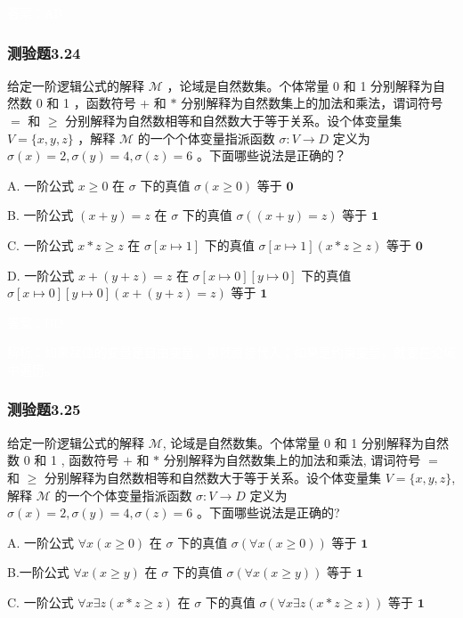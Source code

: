 \documentclass[UTF8, heading=true]{ctexart}
\begin{document}
\textcolor{white}{答案：AB}

\subsubsection{测验题3.24}

给定一阶逻辑公式的解释 $\mathcal{M}$ ，论域是自然数集。个体常量 0 和 1 分别解释为自然数 0 和 1 ，函数符号 + 和 $*$ 分别解释为自然数集上的加法和乘法，谓词符号 $=$ 和 $\geq$ 分别解释为自然数相等和自然数大于等于关系。设个体变量集 $V=\{x, y, z\}$ ，解释 $\mathcal{M}$ 的一个个体变量指派函数 $\sigma: V \rightarrow D$ 定义为 $\sigma(x)=2, \sigma(y)=4, \sigma(z)=6$ 。下面哪些说法是正确的？

A. 一阶公式 $x \geq 0$ 在 $\sigma$ 下的真值 $\sigma(x \geq 0)$ 等于 $\mathbf{0}$

B. 一阶公式 $(x+y)=z$ 在 $\sigma$ 下的真值 $\sigma((x+y)=z)$ 等于 $\mathbf{1}$

C. 一阶公式 $x * z \geq z$ 在 $\sigma[x \mapsto 1]$ 下的真值 $\sigma[x \mapsto 1](x * z \geq z)$ 等于 $\mathbf{0}$

D.  一阶公式 $x+(y+z)=z$ 在 $\sigma[x \mapsto 0][y \mapsto 0]$ 下的真值 $\sigma[x \mapsto 0][y \mapsto 0](x+(y+z)=z)$ 等于 $\mathbf{1}$

\textcolor{white}{答案：BD}

\textcolor{white}{解析：如果赋值的变量是自由变量，那就直接代入；如果是约束变量，就要在论域中遍历。}

\subsubsection{测验题3.25}

给定一阶逻辑公式的解释 $\mathcal{M}$, 论域是自然数集。个体常量 0 和 1 分别解释为自然数 0 和 1 , 函数符号 $+$ 和 $*$ 分别解释为自然数集上的加法和乘法, 谓词符号 $=$ 和 $\geq$ 分别解释为自然数相等和自然数大于等于关系。设个体变量集 $V=\{x, y, z\}$, 解释 $\mathcal{M}$ 的一个个体变量指派函数 $\sigma: V \rightarrow D$ 定义为 $\sigma(x)=2, \sigma(y)=4, \sigma(z)=6$ 。下面哪些说法是正确的?

A. 一阶公式 $\forall x(x \geq 0)$ 在 $\sigma$ 下的真值 $\sigma(\forall x(x \geq 0))$ 等于 $\mathbf{1}$

B.一阶公式 $\forall x(x \geq y)$ 在 $\sigma$ 下的真值 $\sigma(\forall x(x \geq y))$ 等于 $\mathbf{1}$

C. 一阶公式 $\forall x \exists z(x * z \geq z)$ 在 $\sigma$ 下的真值 $\sigma(\forall x \exists z(x * z \geq z))$ 等于 $\mathbf{1}$
\end{document}
